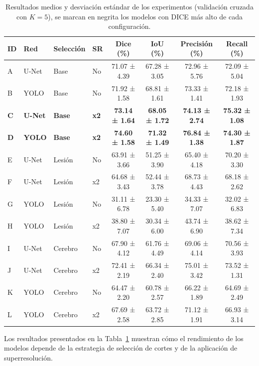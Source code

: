\documentclass[../main.tex]{subfiles}
\begin{document}
\begin{table}[H]
\centering
\setlength{\tabcolsep}{6pt}
\caption{Resultados medios y desviación estándar de los experimentos (validación cruzada con $K=5$), se marcan en negrita los modelos con DICE más alto de cada configuración.}
\label{tab:resultados_kfold_resumen}
\begin{tabular}{llllcccc}
\toprule
ID &   Red & Selección & SR &   Dice (\%) &   IoU (\%) &   Precisión (\%) &   Recall (\%) \\
\midrule
A & U-Net &     Base & No & 71.07 ± 4.39 & 67.28 ± 3.05 &  72.96 ± 5.76 & 72.09 ± 5.04 \\
B &  YOLO &     Base & No & 71.92 ± 1.58 & 68.81 ± 1.61 &  73.33 ± 1.41 & 72.18 ± 1.93 \\
\textbf{C} & \textbf{U-Net} &     \textbf{Base} & \textbf{x2} & \textbf{73.14 ± 1.64} & \textbf{68.05 ± 1.72} & \textbf{74.13 ± 2.74} & \textbf{75.32 ± 1.08} \\
\textbf{D} &  \textbf{YOLO} &     \textbf{Base} & \textbf{x2} & \textbf{74.60 ± 1.58} & \textbf{71.32 ± 1.49} &  \textbf{76.84 ± 1.38} & \textbf{74.30 ± 1.87} \\
E & U-Net &   Lesión & No & 63.91 ± 3.66 & 51.25 ± 3.90 &  65.40 ± 4.18 & 70.20 ± 3.30 \\
F & U-Net &   Lesión & x2 & 64.68 ± 3.43 & 52.44 ± 3.78 &  68.73 ± 4.43 & 68.18 ± 2.62 \\
G &  YOLO &   Lesión & No & 31.11 ± 6.78 & 23.30 ± 5.40 &  34.33 ± 7.07 & 32.02 ± 6.83 \\
H &  YOLO &   Lesión & x2 & 38.80 ± 7.07 & 30.34 ± 6.00 &  43.74 ± 6.90 & 38.62 ± 7.34 \\
I & U-Net & Cerebro  & No & 67.90 ± 4.12 & 61.76 ± 4.49 &  69.06 ± 4.14 & 70.56 ± 3.93 \\
J & U-Net & Cerebro  & x2 & 72.41 ± 2.19 & 66.34 ± 2.40 &  75.01 ± 3.42 & 73.52 ± 1.31 \\
K &  YOLO & Cerebro  & No & 64.47 ± 2.20 & 60.78 ± 2.57 &  66.22 ± 1.89 & 64.69 ± 2.49 \\
L &  YOLO & Cerebro  & x2 & 67.69 ± 2.58 & 63.72 ± 2.85 &  71.12 ± 1.91 & 66.93 ± 3.14 \\
\bottomrule
\end{tabular}
\end{table}

Los resultados presentados en la Tabla~\ref{tab:resultados_kfold_resumen} muestran cómo el rendimiento de los modelos depende de la estrategia de selección de cortes y de la aplicación de superresolución.  
\end{document}

